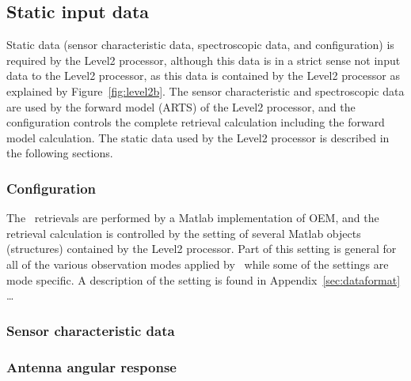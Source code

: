 \clearpage
\newpage


\subsection{Static input data}
\label{sec:static}
Static data (sensor characteristic data, spectroscopic data, and configuration)
is required by the Level2 processor, although this data is in a strict
sense not input data to the Level2 processor, as this data
is contained by the Level2 processor as explained by Figure~\ref{fig:level2b}.
The sensor characteristic and spectroscopic data
are used by the forward model (ARTS) of the Level2 processor,
and the configuration controls the complete retrieval
calculation including the forward model calculation.  
The static data used by the Level2 processor is 
described in the following sections.
 

\subsubsection{Configuration}

The \smr\ retrievals are performed by a Matlab implementation of OEM,
and the retrieval calculation is controlled by the setting of 
several Matlab objects (structures) contained by the Level2 processor.
Part of this setting is general for all of the various 
observation modes applied by \smr\, while some of the settings
are mode specific.
A description of the setting is found in Appendix~\ref{sec:dataformat}
\dots{}\ 


\clearpage
\newpage

\subsubsection{Sensor characteristic data}

\subsubsection*{Antenna angular response}


